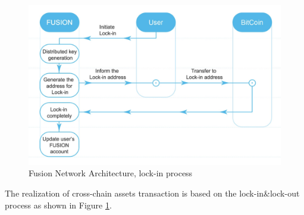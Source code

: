         \begin{figure}[H]
        \includegraphics[width=1\textwidth]{./figures/lockin}
        \centering
        \caption{{Fusion Network Architecture, lock-in process}\protect\footnotemark}
        \centering
        \label{fig:lockin}
        
        \end{figure}
\noindent The realization of cross-chain assets transaction is based on the lock-in\&lock-out process as shown in Figure \ref{fig:lockin}.
